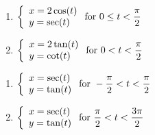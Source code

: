 \begin{multicols}{2} \raggedcolumns 
\begin{enumerate}
\setcounter{enumi}{\value{HW}}

\item ${\displaystyle \left\{ \begin{array}{l} x = 2\cos(t) \\ y = \sec(t) \end{array} \right. \vspace{.25in} \mbox{for } 0 \leq t < \dfrac{\pi}{2}}$
\item ${\displaystyle \left\{ \begin{array}{l} x = 2\tan(t) \\ y = \cot(t) \end{array} \right. \vspace{.25in} \mbox{for } 0 < t < \dfrac{\pi}{2}}$

\setcounter{HW}{\value{enumi}}
\end{enumerate}
\end{multicols}


\begin{multicols}{2} \raggedcolumns 
\begin{enumerate}
\setcounter{enumi}{\value{HW}}

\item ${\displaystyle \left\{ \begin{array}{l} x = \sec(t) \\ y = \tan(t) \end{array} \right. \vspace{.25in} \mbox{for } -\dfrac{\pi}{2} < t < \dfrac{\pi}{2}}$
\item ${\displaystyle \left\{ \begin{array}{l} x = \sec(t) \\ y = \tan(t) \end{array} \right. \vspace{.25in} \mbox{for } \dfrac{\pi}{2} < t < \dfrac{3\pi}{2}}$

\setcounter{HW}{\value{enumi}}
\end{enumerate}
\end{multicols}

